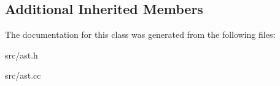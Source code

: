 \subsection*{Additional Inherited Members}


The documentation for this class was generated from the following files\+:\begin{DoxyCompactItemize}
\item 
src/ast.\+h\item 
src/ast.\+cc\end{DoxyCompactItemize}
